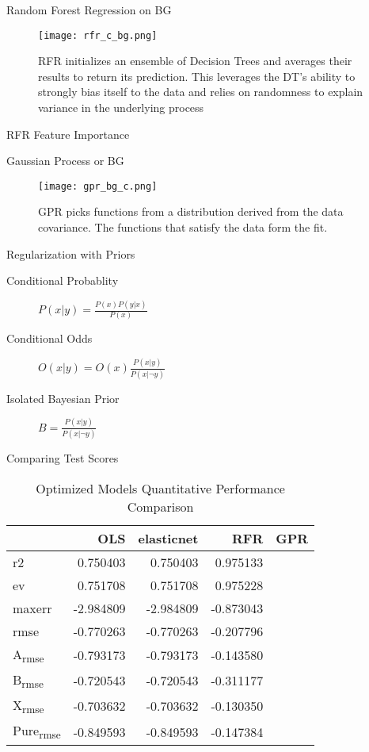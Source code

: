 \documentclass[10pt, compress]{beamer}
\begin{document}
\begin{frame}[allowframebreaks]{Random Forest Regression on BG}
\begin{figure}[htbp]
\centering
\texttt{[image: rfr\_c\_bg.png]}
\caption{RFR initializes an ensemble of Decision Trees and averages their results to return its prediction. This leverages the DT's ability to strongly bias itself to the data and relies on randomness to explain variance in the underlying process}
\end{figure}
\end{frame}
\begin{frame}[label={sec:orgbdefde0}]{RFR Feature Importance}
\end{frame}
\begin{frame}[allowframebreaks]{Gaussian Process or BG}
\begin{figure}[htbp]
\centering
\texttt{[image: gpr\_bg\_c.png]}
\caption{GPR picks functions from a distribution derived from the data covariance. The functions that satisfy the data form the fit.}
\end{figure}
\begin{block}{Regularization with Priors}
\begin{description}
\item[{Conditional Probablity}] \(P(x|y) = \frac{P(x)P(y|x)}{P(x)}\)
\item[{Conditional Odds}] \(O(x|y) = O(x)\frac{P(x|y)}{P(x|\neg{}y)}\)
\item[{Isolated Bayesian Prior}] \(B = \frac{P(x|y)}{P(x|\neg{}y)}\)
\end{description}
\end{block}
\end{frame}

\begin{frame}[label={sec:org4752505}]{Comparing Test Scores}
\begin{table}[htbp]
\caption{Optimized Models Quantitative Performance Comparison}
\centering
\begin{tabular}{lrrrl}
 & OLS & elasticnet & RFR & GPR\\
\hline
r2 & 0.750403 & 0.750403 & 0.975133 & \\
ev & 0.751708 & 0.751708 & 0.975228 & \\
maxerr & -2.984809 & -2.984809 & -0.873043 & \\
rmse & -0.770263 & -0.770263 & -0.207796 & \\
A\textsubscript{rmse} & -0.793173 & -0.793173 & -0.143580 & \\
B\textsubscript{rmse} & -0.720543 & -0.720543 & -0.311177 & \\
X\textsubscript{rmse} & -0.703632 & -0.703632 & -0.130350 & \\
Pure\textsubscript{rmse} & -0.849593 & -0.849593 & -0.147384 & \\
\end{tabular}
\end{table}
\end{frame}
\section{}
\label{sec:org5a7a7dc}
\printbibliography
\end{document}
